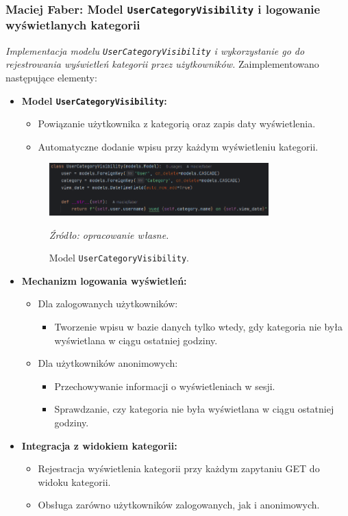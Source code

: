 \documentclass[12pt,a4paper,oneside]{article}
\theoremstyle{definition}
\numberwithin{equation}{section}
\begin{document}
\subsubsection{Maciej Faber: Model \texttt{UserCategoryVisibility} i logowanie wyświetlanych kategorii}
\label{section:1.3.48}
\textit{
Implementacja modelu \texttt{UserCategoryVisibility} i wykorzystanie go do rejestrowania wyświetleń kategorii przez użytkowników.
}
Zaimplementowano następujące elementy:
\begin{itemize}
    \item \textbf{Model \texttt{UserCategoryVisibility}:}
    \begin{itemize}
        \item Powiązanie użytkownika z kategorią oraz zapis daty wyświetlenia.
        \item Automatyczne dodanie wpisu przy każdym wyświetleniu kategorii.
    \end{itemize}
    \begin{figure}[H]
        \centering
        \includegraphics[width=0.8\textwidth]{images/krzysztofBImages/category_visibility_model.png}
        \caption{Model \texttt{UserCategoryVisibility}.}
        \emph{Źródło: opracowanie własne.}
        \label{fig:user_category_visibility_model}
    \end{figure}
    \item \textbf{Mechanizm logowania wyświetleń:}
    \begin{itemize}
        \item Dla zalogowanych użytkowników:
        \begin{itemize}
            \item Tworzenie wpisu w bazie danych tylko wtedy, gdy kategoria nie była wyświetlana w ciągu ostatniej godziny.
        \end{itemize}
        \item Dla użytkowników anonimowych:
        \begin{itemize}
            \item Przechowywanie informacji o wyświetleniach w sesji.
            \item Sprawdzanie, czy kategoria nie była wyświetlana w ciągu ostatniej godziny.
        \end{itemize}
    \end{itemize}
    \item \textbf{Integracja z widokiem kategorii:}
    \begin{itemize}
        \item Rejestracja wyświetlenia kategorii przy każdym zapytaniu GET do widoku kategorii.
        \item Obsługa zarówno użytkowników zalogowanych, jak i anonimowych.
    \end{itemize}
\end{itemize}
\end{document}
